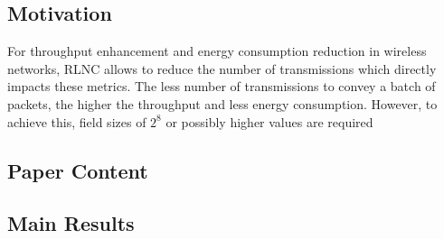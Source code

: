 \subsection*{Motivation}
For throughput enhancement and energy consumption reduction in wireless networks, \ac{RLNC} allows to reduce the number of transmissions which directly impacts these metrics. The less number of transmissions to convey a batch of packets, the higher the throughput and less energy consumption. However, to achieve this, field sizes of $2^8$ or possibly higher values are required  
\subsection*{Paper Content}
\subsection*{Main Results}
\clearpage


